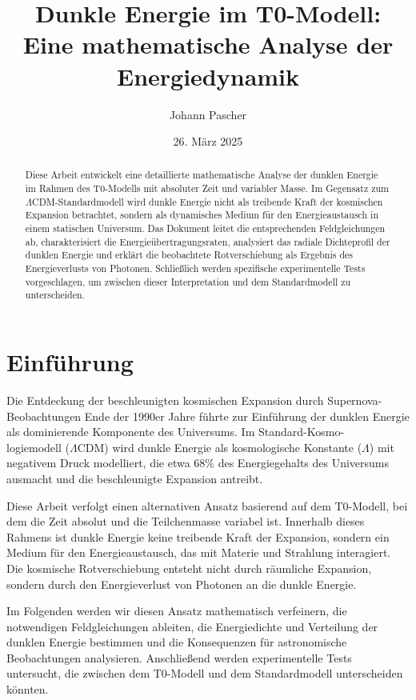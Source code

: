 \documentclass[a4paper,12pt]{article}
\theoremstyle{definition}
\theoremstyle{remark}
\begin{document}
	
	\title{Dunkle Energie im T0-Modell: \\Eine mathematische Analyse der Energiedynamik}
	\author{Johann Pascher}
	\date{26. März 2025}
	\maketitle
	
	\begin{abstract}
		Diese Arbeit entwickelt eine detaillierte mathematische Analyse der dunklen Energie im Rahmen des T0-Modells mit absoluter Zeit und variabler Masse. Im Gegensatz zum $\Lambda$CDM-Standardmodell wird dunkle Energie nicht als treibende Kraft der kosmischen Expansion betrachtet, sondern als dynamisches Medium für den Energieaustausch in einem statischen Universum. Das Dokument leitet die entsprechenden Feldgleichungen ab, charakterisiert die Energieübertragungsraten, analysiert das radiale Dichteprofil der dunklen Energie und erklärt die beobachtete Rotverschiebung als Ergebnis des Energieverlusts von Photonen. Schließlich werden spezifische experimentelle Tests vorgeschlagen, um zwischen dieser Interpretation und dem Standardmodell zu unterscheiden.
	\end{abstract}
	
	\tableofcontents
	\newpage
	
	\section{Einführung}
	Die Entdeckung der beschleunigten kosmischen Expansion durch Supernova-Beobachtungen Ende der 1990er Jahre führte zur Einführung der dunklen Energie als dominierende Komponente des Universums. Im Standard-Kosmo-\\logiemodell ($\Lambda$CDM) wird dunkle Energie als kosmologische Konstante ($\Lambda$) mit negativem Druck modelliert, die etwa 68\% des Energiegehalts des Universums ausmacht und die beschleunigte Expansion antreibt.
	
	Diese Arbeit verfolgt einen alternativen Ansatz basierend auf dem T0-Modell, bei dem die Zeit absolut und die Teilchenmasse variabel ist. Innerhalb dieses Rahmens ist dunkle Energie keine treibende Kraft der Expansion, sondern ein Medium für den Energieaustausch, das mit Materie und Strahlung interagiert. Die kosmische Rotverschiebung entsteht nicht durch räumliche Expansion, sondern durch den Energieverlust von Photonen an die dunkle Energie.
	
	Im Folgenden werden wir diesen Ansatz mathematisch verfeinern, die notwendigen Feldgleichungen ableiten, die Energiedichte und Verteilung der dunklen Energie bestimmen und die Konsequenzen für astronomische Beobachtungen analysieren. Anschließend werden experimentelle Tests untersucht, die zwischen dem T0-Modell und dem Standardmodell unterscheiden könnten.
	
\end{document}
